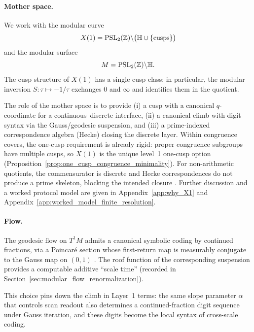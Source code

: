 \paragraph{Mother space.}
We work with the modular curve
\begin{equation}
X(1)=\mathrm{PSL}_2(\mathbb{Z})\backslash\big(\mathbb{H}\cup\{\text{cusps}\}\big)
\end{equation}
and the modular surface
\begin{equation}
M=\mathrm{PSL}_2(\mathbb{Z})\backslash\mathbb{H}.
\end{equation}
The cusp structure of $X(1)$ has a single cusp class; in particular, the modular inversion $S:\tau\mapsto -1/\tau$ exchanges $0$ and $\infty$ and identifies them in the quotient.
\begin{remark}
The role of the mother space is to provide (i) a cusp with a canonical $q$-coordinate for a continuous--discrete interface, (ii) a canonical climb with digit syntax via the Gauss/geodesic suspension, and (iii) a prime-indexed correspondence algebra (Hecke) closing the discrete layer.
Within congruence covers, the one-cusp requirement is already rigid: proper congruence subgroups have multiple cusps, so $X(1)$ is the unique level~1 one-cusp option (Proposition~\ref{prop:one_cusp_congruence_minimality}).
For non-arithmetic quotients, the commensurator is discrete and Hecke correspondences do not produce a prime skeleton, blocking the intended closure \cite{Margulis1991}.
Further discussion and a worked protocol model are given in Appendix~\ref{app:why_X1} and Appendix~\ref{app:worked_model_finite_resolution}.
\end{remark}

\paragraph{Flow.}
The geodesic flow on $T^1M$ admits a canonical symbolic coding by continued fractions, via a Poincar\'e section whose first-return map is measurably conjugate to the Gauss map on $(0,1)$ \cite{Series1985}. The roof function of the corresponding suspension provides a computable additive ``scale time'' (recorded in Section~\ref{sec:modular_flow_renormalization}).

This choice pins down the climb in Layer~1 terms: the same slope parameter $\alpha$ that controls scan readout also determines a continued-fraction digit sequence under Gauss iteration, and these digits become the local syntax of cross-scale coding.


